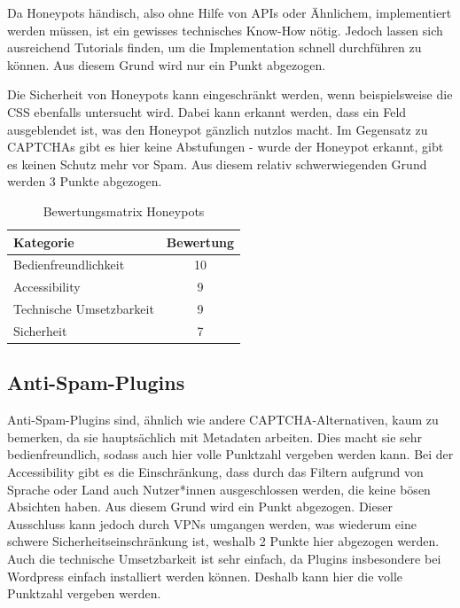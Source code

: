 Da Honeypots händisch, also ohne Hilfe von APIs oder Ähnlichem, implementiert werden müssen, ist ein gewisses technisches Know-How nötig.
Jedoch lassen sich ausreichend Tutorials finden, um die Implementation schnell durchführen zu können.
Aus diesem Grund wird nur ein Punkt abgezogen.

Die Sicherheit von Honeypots kann eingeschränkt werden, wenn beispielsweise die CSS ebenfalls untersucht wird. 
Dabei kann erkannt werden, dass ein Feld ausgeblendet ist, was den Honeypot gänzlich nutzlos macht.
Im Gegensatz zu CAPTCHAs gibt es hier keine Abstufungen - wurde der Honeypot erkannt, gibt es keinen Schutz mehr vor Spam.
Aus diesem relativ schwerwiegenden Grund werden 3 Punkte abgezogen.

\begin{table}[h!]
    \caption{Bewertungsmatrix Honeypots}
    \begin{center}
        \begin{tabular}{l|c}
            Kategorie                       & Bewertung \\\hline
            Bedienfreundlichkeit            & 10         \\
            Accessibility                   & 9        \\
            Technische Umsetzbarkeit        & 9         \\
            Sicherheit                      & 7         
        \end{tabular}
    \end{center}
\end{table}

\subsection{Anti-Spam-Plugins}
Anti-Spam-Plugins sind, ähnlich wie andere CAPTCHA-Alternativen, kaum zu bemerken, da sie hauptsächlich mit Metadaten arbeiten.
Dies macht sie sehr bedienfreundlich, sodass auch hier volle Punktzahl vergeben werden kann.
Bei der Accessibility gibt es die Einschränkung, dass durch das Filtern aufgrund von Sprache oder Land auch Nutzer*innen ausgeschlossen werden,
die keine bösen Absichten haben. Aus diesem Grund wird ein Punkt abgezogen.
Dieser Ausschluss kann jedoch durch VPNs umgangen werden,
was wiederum eine schwere Sicherheitseinschränkung ist, weshalb 2 Punkte hier abgezogen werden.
Auch die technische Umsetzbarkeit ist sehr einfach, da Plugins insbesondere bei Wordpress einfach installiert werden können.
Deshalb kann hier die volle Punktzahl vergeben werden.

